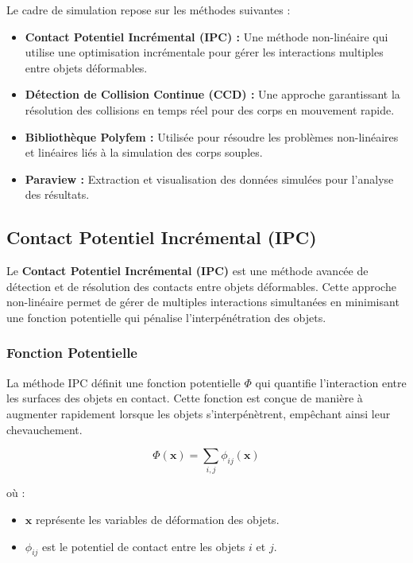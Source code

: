 Le cadre de simulation repose sur les méthodes suivantes :
\begin{itemize}
    \item \textbf{Contact Potentiel Incrémental (IPC) :} Une méthode non-linéaire qui utilise une optimisation incrémentale pour gérer les interactions multiples entre objets déformables.
    \item \textbf{Détection de Collision Continue (CCD) :} Une approche garantissant la résolution des collisions en temps réel pour des corps en mouvement rapide.
    \item \textbf{Bibliothèque Polyfem :} Utilisée pour résoudre les problèmes non-linéaires et linéaires liés à la simulation des corps souples.
    \item \textbf{Paraview :} Extraction et visualisation des données simulées pour l'analyse des résultats.
\end{itemize}

\subsection{Contact Potentiel Incrémental (IPC)}

Le \textbf{Contact Potentiel Incrémental (IPC)} est une méthode avancée de détection et de résolution des contacts entre objets déformables. Cette approche non-linéaire permet de gérer de multiples interactions simultanées en minimisant une fonction potentielle qui pénalise l'interpénétration des objets.

\subsubsection{Fonction Potentielle}

La méthode IPC définit une fonction potentielle \( \Phi \) qui quantifie l'interaction entre les surfaces des objets en contact. Cette fonction est conçue de manière à augmenter rapidement lorsque les objets s'interpénètrent, empêchant ainsi leur chevauchement.

\[
\Phi(\mathbf{x}) = \sum_{i,j} \phi_{ij}(\mathbf{x})
\]

où :
\begin{itemize}
    \item \( \mathbf{x} \) représente les variables de déformation des objets.
    \item \( \phi_{ij} \) est le potentiel de contact entre les objets \( i \) et \( j \).
\end{itemize}

